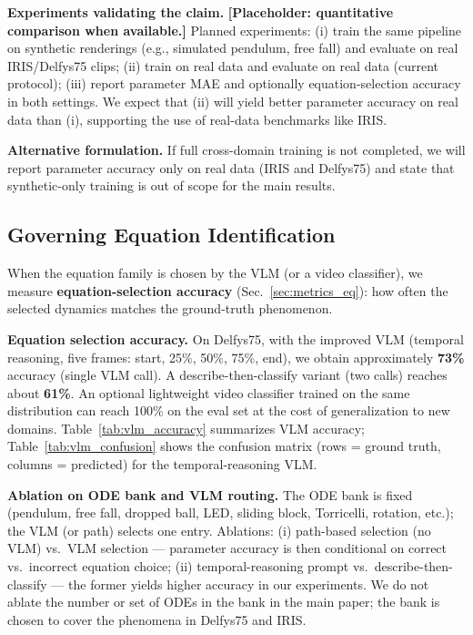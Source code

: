 \textbf{Experiments validating the claim.} \textbf{[Placeholder: quantitative comparison when available.]} Planned experiments: (i) train the same pipeline on synthetic renderings (e.g., simulated pendulum, free fall) and evaluate on real IRIS/Delfys75 clips; (ii) train on real data and evaluate on real data (current protocol); (iii) report parameter MAE and optionally equation-selection accuracy in both settings. We expect that (ii) will yield better parameter accuracy on real data than (i), supporting the use of real-data benchmarks like IRIS.

\textbf{Alternative formulation.} If full cross-domain training is not completed, we will report parameter accuracy only on real data (IRIS and Delfys75) and state that synthetic-only training is out of scope for the main results.

\subsection{Governing Equation Identification}
\label{sec:exp_eq_identification}

When the equation family is chosen by the VLM (or a video classifier), we measure \textbf{equation-selection accuracy} (Sec.~\ref{sec:metrics_eq}): how often the selected dynamics matches the ground-truth phenomenon.

\textbf{Equation selection accuracy.} On Delfys75, with the improved VLM (temporal reasoning, five frames: start, 25\%, 50\%, 75\%, end), we obtain approximately \textbf{73\%} accuracy (single VLM call). A describe-then-classify variant (two calls) reaches about \textbf{61\%}. An optional lightweight video classifier trained on the same distribution can reach 100\% on the eval set at the cost of generalization to new domains. Table~\ref{tab:vlm_accuracy} summarizes VLM accuracy; Table~\ref{tab:vlm_confusion} shows the confusion matrix (rows = ground truth, columns = predicted) for the temporal-reasoning VLM.

\textbf{Ablation on ODE bank and VLM routing.} The ODE bank is fixed (pendulum, free fall, dropped ball, LED, sliding block, Torricelli, rotation, etc.); the VLM (or path) selects one entry. Ablations: (i) path-based selection (no VLM) vs.\ VLM selection — parameter accuracy is then conditional on correct vs.\ incorrect equation choice; (ii) temporal-reasoning prompt vs.\ describe-then-classify — the former yields higher accuracy in our experiments. We do not ablate the number or set of ODEs in the bank in the main paper; the bank is chosen to cover the phenomena in Delfys75 and IRIS.


